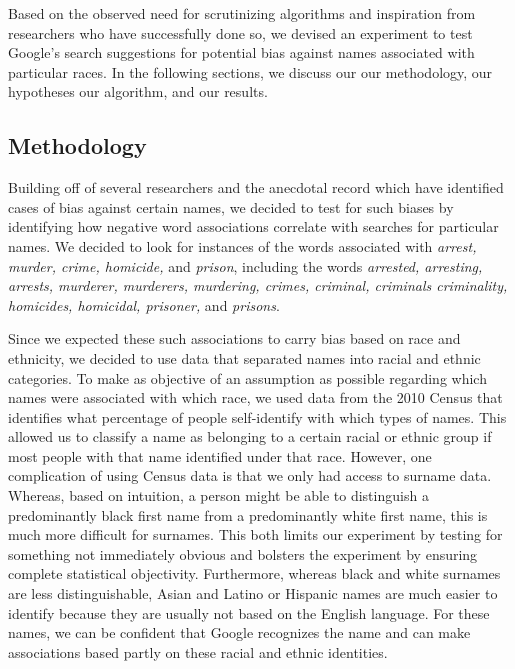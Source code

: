 \documentclass[sigconf]{acmart}
\begin{document}
Based on the observed need for scrutinizing algorithms and inspiration from researchers who have successfully done so, we devised an experiment to test Google's search suggestions for potential bias against names associated with particular races. In the following sections, we discuss our our methodology, our hypotheses our algorithm, and our results.

\subsection{Methodology}

Building off of several researchers and the anecdotal record which have identified cases of bias against certain names, we decided to test for such biases by identifying how negative word associations correlate with searches for particular names. We decided to look for instances of the words associated with {\em arrest, murder, crime, homicide,} and {\em prison}, including the words {\em arrested, arresting, arrests, murderer, murderers, murdering, crimes, criminal, criminals criminality, homicides, homicidal, prisoner,} and {\em prisons}. 

Since we expected these such associations to carry bias based on race and ethnicity, we decided to use data that separated names into racial and ethnic categories. To make as objective of an assumption as possible regarding which names were associated with which race, we used data from the 2010 Census that identifies what percentage of people self-identify with which types of names. This allowed us to classify a name as belonging to a certain racial or ethnic group if most people with that name identified under that race. However, one complication of using Census data is that we only had access to surname data. Whereas, based on intuition, a person might be able to distinguish a predominantly black first name from a predominantly white first name, this is much more difficult for surnames. This both limits our experiment by testing for something not immediately obvious and bolsters the experiment by ensuring complete statistical objectivity. Furthermore, whereas black and white surnames are less distinguishable, Asian and Latino or Hispanic names are much easier to identify because they are usually not based on the English language. For these names, we can be confident that Google recognizes the name and can make associations based partly on these racial and ethnic identities.
\end{document}
